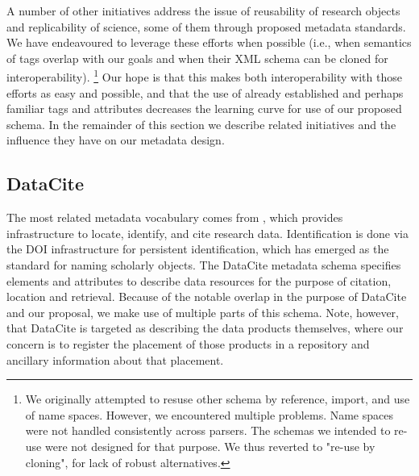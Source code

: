 A number of other initiatives address the issue of reusability of research objects and replicability of science, some of them through proposed metadata standards.  We have endeavoured to leverage these efforts when possible (i.e., when semantics of tags overlap with our goals and when their XML schema can be cloned for interoperability).%
\footnote{We originally attempted to resuse other schema by reference, import, and use of name spaces. However, we encountered multiple problems. Name spaces were not handled consistently across parsers. The schemas we intended to re-use were not designed for that purpose. We thus reverted to "re-use by cloning", for lack of robust alternatives.} 
Our hope is that this makes both interoperability with those efforts as easy and possible, and that the use of already established and perhaps familiar tags and attributes decreases the learning curve for use of our proposed schema.  In the remainder of this section we describe related initiatives and the influence they have on our metadata design.

\subsection{DataCite}
The most related metadata vocabulary comes from , which provides infrastructure to locate, identify, and cite research data. Identification is done via the DOI infrastructure for persistent identification, which has emerged as the standard for naming scholarly objects.  The DataCite metadata schema \parencite{DataCiteMetadataWorkingGroupDataCiteMetadataSchema2017a,DataCiteMetadataWorkingGroupDataCiteMetadataSchema2017} specifies elements and attributes to describe data resources for the purpose of citation, location and retrieval.  Because of the notable overlap in the purpose of DataCite  and our proposal, we make use of multiple parts of this schema. Note, however, that DataCite is targeted as describing the data products themselves, where our concern is to register the placement of those products in a repository and ancillary information about that placement.

